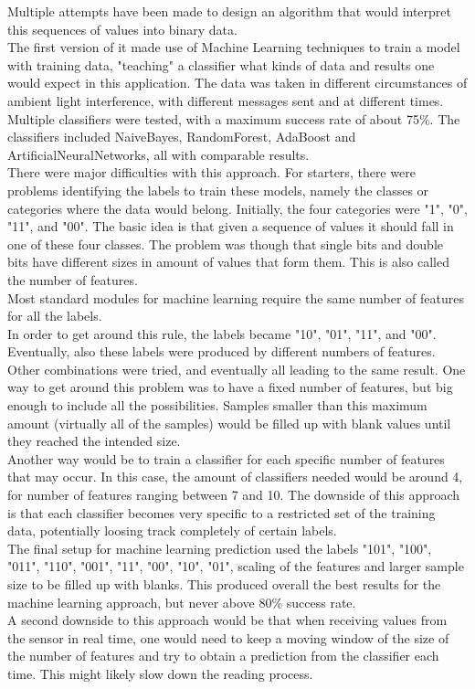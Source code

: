 Multiple attempts have been made to design an algorithm that would interpret this sequences of values into binary data.\\
The first version of it made use of Machine Learning techniques to train a model with training data, "teaching" a classifier what kinds of data and results one would expect in this application. The data was taken in different circumstances of ambient light interference, with different messages sent and at different times.
Multiple classifiers were tested, with a maximum success rate of about 75\%. The classifiers included NaiveBayes, RandomForest, AdaBoost and ArtificialNeuralNetworks, all with comparable results.\\
There were major difficulties with this approach. For starters, there were problems identifying the labels to train these models, namely the classes or categories where the data would belong.
Initially, the four categories were "1", "0", "11", and "00". The basic idea is that given a sequence of values it should fall in one of these four classes. The problem was though that single bits and double bits have different sizes in amount of values that form them. This is also called the number of features.\\
Most standard modules for machine learning require the same number of features for all the labels.\\
In order to get around this rule, the labels became "10", "01", "11", and "00". Eventually, also these labels were produced by different numbers of features. Other combinations were tried, and eventually all leading to the same result. 
One way to get around this problem was to have a fixed number of features, but big enough to include all the possibilities. Samples smaller than this maximum amount (virtually all of the samples) would be filled up with blank values until they reached the intended size.\\
Another way would be to train a classifier for each specific number of features that may occur. In this case, the amount of classifiers needed would be around 4, for number of features ranging between 7 and 10.
The downside of this approach is that each classifier becomes very specific to a restricted set of the training data, potentially loosing track completely of certain labels.\\
The final setup for machine learning prediction used the labels "101", "100", "011", "110", "001", "11", "00", "10", "01", scaling of the features and larger sample size to be filled up with blanks. This produced overall the best results for the machine learning approach, but never above 80\% success rate.\\
A second downside to this approach would be that when receiving values from the sensor in real time, one would need to 
keep a moving window  of the size of the number of features and try to obtain a prediction from the classifier each time.
This might likely slow down the reading process.\\

